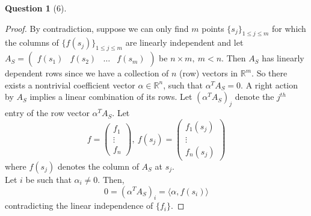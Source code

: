 \documentclass[11pt]{article}
\theoremstyle{quest}
\newtheorem*{question}{Question}
\begin{document}
\begin{question}[6]
\end{question}
\begin{proof}
By contradiction, suppose we can only find $m$ points $\{s_j\}_{1 \le j \le m}$ for which the columns of $\{f(s_j)\}_{1 \le j \le m}$ are linearly independent and let $A_S = \begin{pmatrix}
f(s_1) & f(s_2) & \ldots & f(s_m)
\end{pmatrix}$ be $n \times m,\ m < n$. Then $A_S$ has linearly dependent rows since we have a collection of $n$ (row) vectors in $\mathbb{R}^m$. So there exists a nontrivial coefficient vector $\alpha \in \mathbb{R}^n$, such that $\alpha^T A_S = 0$. A right action by $A_S$ implies a linear combination of its rows. Let $(\alpha^T A_S)_j$ denote the $j^{th}$ entry of the row vector $\alpha^T A_S$. Let 
$$f = \begin{pmatrix}
f_1 \\
\vdots \\
f_n
\end{pmatrix},\ f(s_j) = \begin{pmatrix}
f_1(s_j) \\
\vdots \\
f_n(s_j)
\end{pmatrix}$$
where $f(s_j)$ denotes the column of $A_S$ at $s_j$.
\\Let $i$ be such that $\alpha_i \ne 0$. Then,
$$0= (\alpha^T A_S)_i = \langle \alpha, f(s_i) \rangle$$
contradicting the linear independence of $\{f_i\}$.
\end{proof}
\end{document}
